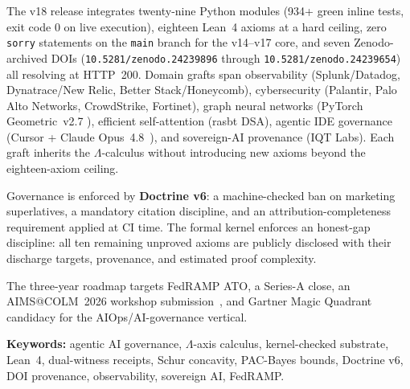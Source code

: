 \medskip

The v18 release integrates twenty-nine Python modules (934+ green inline
tests, exit code 0 on live execution), eighteen Lean~4 axioms at a hard
ceiling, zero \texttt{sorry} statements on the \texttt{main} branch for
the v14--v17 core, and seven Zenodo-archived DOIs
(\texttt{10.5281/zenodo.24239896} through \texttt{10.5281/zenodo.24239654})
all resolving at HTTP~200.
Domain grafts span observability (Splunk/Datadog, Dynatrace/New Relic,
Better Stack/Honeycomb), cybersecurity (Palantir, Palo Alto Networks,
CrowdStrike, Fortinet), graph neural networks (PyTorch Geometric~v2.7
\cite{fey2019fast}), efficient self-attention (rasbt DSA), agentic IDE
governance (Cursor + Claude Opus~4.8~\cite{anthropic2024mcp}), and
sovereign-AI provenance (IQT Labs).
Each graft inherits the \(\Lambda\)-calculus without introducing new
axioms beyond the eighteen-axiom ceiling.

\medskip

Governance is enforced by \textbf{Doctrine v6}: a machine-checked
ban on marketing superlatives, a mandatory citation discipline, and an
attribution-completeness requirement applied at CI time.
The formal kernel enforces an honest-gap discipline: all ten remaining
unproved axioms are publicly disclosed with their discharge targets,
provenance, and estimated proof complexity.

\medskip

The three-year roadmap targets FedRAMP ATO, a Series-A close, an
AIMS@COLM~2026 workshop submission~\cite{aims2026colm}, and Gartner
Magic Quadrant candidacy for the AIOps/AI-governance vertical.

\bigskip
\noindent\textbf{Keywords:} agentic AI governance, \(\Lambda\)-axis
calculus, kernel-checked substrate, Lean~4, dual-witness receipts,
Schur concavity, PAC-Bayes bounds, Doctrine v6, DOI provenance,
observability, sovereign AI, FedRAMP.
